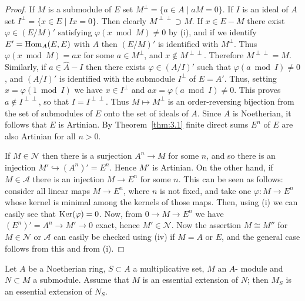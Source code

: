 \begin{proof}
If $M$ is a submodule of $E$ set $M^\perp = \{a \in A \mid aM = 0\}$. If $I$ is an ideal of $A$ set
$I^\perp = \{x \in E \mid Ix = 0\}$. Then clearly $M^{\perp\perp} \supset M$. If $x \in E - M$ there exist
$\varphi \in (E/M)'$ satisfying $\varphi(x \bmod M) \neq 0$ by (i), and if we identify $E' =
\operatorname{Hom}_A(E, E)$ with $A$ then $(E/M)'$ is identified with $M^\perp$. Thus $\varphi(x \bmod M) =
ax$ for some $a \in M^\perp$, and $x \notin M^{\perp\perp}$. Therefore $M^{\perp\perp} = M$. Similarly, if
$a \in \hat{A} - I$ then there exists $\varphi \in (A/I)'$ such that $\varphi(a \bmod I) \neq 0$, and
$(A/I)'$ is identified with the submodule $I^\perp$ of $E = A'$. Thus, setting $x =
\varphi(1 \bmod I)$ we have $x \in I^\perp$ and $ax = \varphi(a \bmod I) \neq 0$. This proves $a \notin I^{\perp\perp}$, so
that $I = I^{\perp\perp}$. Thus $M \mapsto M^\perp$ is an order-reversing bijection from the set of
submodules of $E$ onto the set of ideals of $A$. Since $A$ is Noetherian, it follows
that $E$ is Artinian. By Theorem~\ref{thm:3.1} finite direct sums $E^n$ of $E$ are also
Artinian for all $n > 0$.

If $M \in \mathcal{N}$ then there is a surjection $A^n \to M$ for some $n$, and so
there is an injection $M' \hookrightarrow (A^n)' = E^n$. Hence $M'$ is Artinian. On the
other hand, if $M \in \mathcal{A}$ there is an injection $M \to E^n$ for some $n$. This can be
seen as follows: consider all linear maps $M \to E^n$, where $n$ is not fixed,
and take one $\varphi\colon M \to E^n$ whose kernel is minimal among the kernels of
those maps. Then, using (i) we can easily see that $\operatorname{Ker}(\varphi) = 0$. Now, from
$0 \to M \to E^n$ we have $(E^n)' = A^n \to M' \to 0$ exact, hence $M' \in \mathcal{N}$. Now the
assertion $M \cong M''$ for $M \in \mathcal{N}$ or $\mathcal{A}$ can easily be checked using (iv) if $M = A$
or $E$, and the general case follows from this and from (i).
\end{proof}

\begin{lemma}\label{lem:18.6}
Let $A$ be a Noetherian ring, $S \subset A$ a multiplicative set, $M$ an $A$-
module and $N \subset M$ a submodule. Assume that $M$ is an essential extension
of $N$; then $M_S$ is an essential extension of $N_S$.
\end{lemma}

